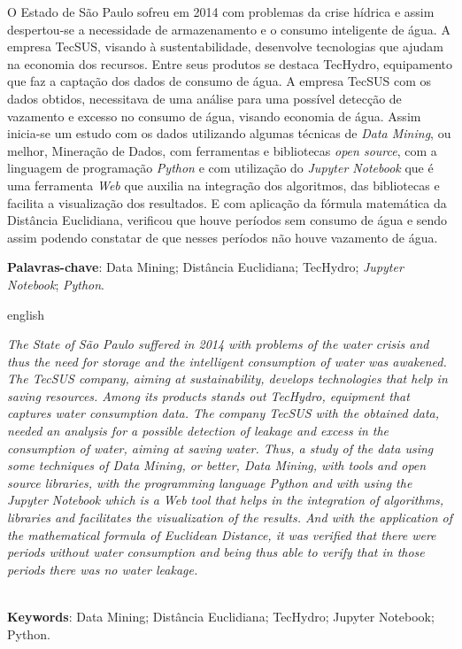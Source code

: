 \setlength{\absparsep}{18pt} %
\begin{resumo}
O Estado de São Paulo sofreu em 2014 com problemas da crise hídrica e assim despertou-se a necessidade de armazenamento e o consumo inteligente de água.
A empresa TecSUS, visando à sustentabilidade, desenvolve tecnologias que ajudam na economia dos recursos. Entre seus produtos se destaca TecHydro, equipamento que faz a captação dos dados de consumo de água. A empresa TecSUS com os dados obtidos, necessitava de uma análise para uma possível detecção de vazamento e  excesso no consumo de água, visando economia de água. Assim inicia-se um estudo com os dados utilizando algumas técnicas de \emph{Data Mining}, ou melhor, Mineração de Dados, com ferramentas e bibliotecas \emph{open source}, com a linguagem de programação \emph{Python} e com utilização do \emph{Jupyter Notebook} que é uma ferramenta \emph{Web} que auxilia na integração dos algoritmos, das bibliotecas e facilita a visualização dos resultados.
E com aplicação da fórmula matemática da Distância Euclidiana, verificou que houve períodos sem consumo de água e sendo assim podendo constatar de que nesses períodos não houve vazamento de água.
    
    \vspace{\onelineskip}
    \noindent
    \textbf{Palavras-chave}: Data Mining; Distância Euclidiana; TecHydro; \emph{Jupyter Notebook}; \emph{Python}.
\end{resumo}

\begin{resumo}[Abstract]
    \begin{otherlanguage*}{english}

\textit{
The State of São Paulo suffered in 2014 with problems of the water crisis and thus the need for storage and the intelligent consumption of water was awakened.
 The TecSUS company, aiming at sustainability, develops technologies that help in saving resources. Among its products stands out TecHydro, equipment that captures water consumption data. The company TecSUS with the obtained data, needed an analysis for a possible detection of leakage and excess in the consumption of water, aiming at saving water. Thus, a study of the data using some techniques of Data Mining, or better, Data Mining, with tools and open source libraries, with the programming language Python and with using the Jupyter Notebook which is a Web tool that helps in the integration of algorithms, libraries and facilitates the visualization of the results.
 And with the application of the mathematical formula of Euclidean Distance, it was verified that there were periods without water consumption and being thus able to verify that in those periods there was no water leakage.
}%

	    \vspace{\onelineskip}
	    \noindent
	    \\
	    \textbf{Keywords}: Data Mining; Distância Euclidiana; TecHydro; Jupyter Notebook; Python.
    \end{otherlanguage*}
\end{resumo}